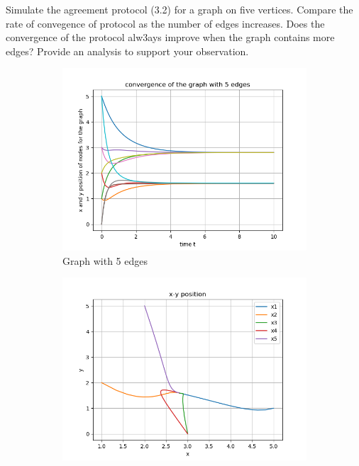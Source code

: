 \documentclass{article}
\begin{document}
\begin{problem}
    Simulate the agreement protocol (3.2) for a graph on five vertices. Compare the rate of convegence of protocol as the number of edges increases. Does the convergence of the protocol alw3ays improve when the graph contains more edges? Provide an analysis to support your observation. 
    \begin{figure}[!ht]
        \centering
        \begin{subfigure}{0.4\textwidth}
            \includegraphics[width=\textwidth]{./img/Figure_1.png}
            \caption{Graph with 5 edges}
        \end{subfigure}
        \begin{subfigure}{0.4\textwidth}
            \includegraphics[width=\textwidth]{./img/Figure_2.png}

\end{subfigure}
\end{figure}
\end{problem}
\end{document}

